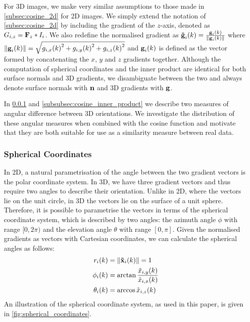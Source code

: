 For 3D images, we make very similar
assumptions to those made in \cref{subsec:cosine_2d} for 2D images.
We simply extend the notation of \cref{subsec:cosine_2d} by including the
gradient of the $z$-axis, denoted as $G_{i,z} = \boldsymbol{\mathbf{F}}_z \ast I_i$.
We also redefine the normalised gradient as
$\boldsymbol{\mathbf{\tilde{g}}}_{i}(k) = \frac{\boldsymbol{\mathbf{g}}_{i}(k)}{\lVert{} \boldsymbol{\mathbf{g}}_{i}(k) \rVert}$
where $\lVert{} \boldsymbol{\mathbf{g}}_{i}(k) \rVert = \sqrt{{g_{i,x}(k)}^2 + {g_{i,y}(k)}^2 +
{g_{i,z}(k)}^2}$ and $\boldsymbol{\mathbf{g}}_{i}(k)$ is defined as the vector formed by
concatenating the $x$, $y$ and $z$ gradients together. Although the
computation of spherical coordinates and the inner product are identical for
both surface normals and 3D gradients, we disambiguate between the two and
always denote surface normals with $\boldsymbol{\mathbf{n}}$ and 3D gradients with $\boldsymbol{\mathbf{g}}$.

In \cref{subsubsec:cosine_spherical} and
\cref{subsubsec:cosine_inner_product} we describe two measures of angular
difference between 3D orientations. We investigate the distribution of these
angular measures when combined with the cosine function and motivate that they
are both suitable for use as a similarity measure between real data.
\subsubsection{Spherical Coordinates}\label{subsubsec:cosine_spherical}
In 2D, a natural parametrisation of the angle between the two gradient vectors
is the polar coordinate system. In 3D, we have three gradient vectors and thus
require two angles to describe their orientation. Unlike in 2D, where the
vectors lie on the unit circle, in 3D the vectors lie on the surface of a unit
sphere. Therefore, it is possible to parametrise the vectors in terms of the
spherical coordinate system, which is described by two angles: the azimuth angle
$\phi$ with range $[0, 2\pi)$ and the elevation angle $\theta$ with range
$[0, \pi]$. Given the normalised gradients as vectors with Cartesian
coordinates, we can calculate the spherical angles as follows:
\begin{equation}\label{eq:cartesian_to_spherical}
    \begin{aligned}
        r_i(k)      &= \lVert \boldsymbol{\mathbf{\tilde{x}}}_{i}(k) \rVert = 1            \\
        \phi_i(k)   &= \arctan{\frac{\tilde{x}_{i,y}(k)}{\tilde{x}_{i,x}(k)}} \\
        \theta_i(k) &= \arccos{\tilde{x}_{i,z}(k)}
    \end{aligned}
\end{equation}
An illustration of the spherical coordinate system, as used in this paper, is
given in \cref{fig:spherical_coordinates}.


